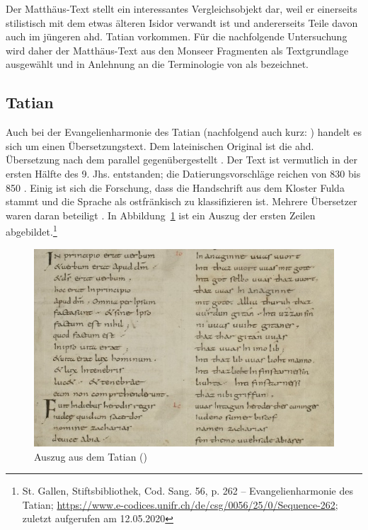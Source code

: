 Der Matthäus-Text stellt ein interessantes Vergleichsobjekt dar, weil er  einerseits stilistisch mit dem etwas älteren Isidor verwandt ist \parencite{Hench1893,Lippert1974} und andererseits Teile davon auch im jüngeren ahd. Tatian vorkommen. Für die nachfolgende Untersuchung wird daher der Matthäus-Text aus den Monseer Fragmenten als Textgrundlage ausgewählt und in Anlehnung an die Terminologie von \textcite{Lippert1974} als  bezeichnet.
  
\subsection{Tatian}\label{sec:tatian}

Auch bei der Evangelienharmonie des Tatian (nachfolgend auch kurz: ) handelt es sich um einen Übersetzungstext. Dem lateinischen Original ist die ahd. Übersetzung nach dem  \parencite[43]{Fleischer2011} parallel gegenübergestellt \parencite[vgl. hierzu auch][128]{Masser1997}. Der Text ist vermutlich in der ersten Hälfte des 9. Jhs. entstanden; die Datierungsvorschläge reichen von 830 \parencite[LXX]{Sievers1961} bis 850 \parencite[127]{Sonderegger2003}. Einig ist sich die Forschung, dass die Handschrift aus dem Kloster Fulda stammt und die Sprache als ostfränkisch zu klassifizieren ist. Mehrere Übersetzer waren daran beteiligt \parencite[s.][31]{Masser1994}. In Abbildung~\ref{abb:tatian-hand} ist ein Auszug der ersten Zeilen abgebildet.\footnote{St. Gallen, Stiftsbibliothek, Cod. Sang. 56, p. 262 –
Evangelienharmonie des Tatian; \url{https://www.e-codices.unifr.ch/de/csg/0056/25/0/Sequence-262}; zuletzt aufgerufen am 12.05.2020}

\begin{figure}[h]
\begin{center}
  \includegraphics[width=10 cm]{images/tatian-handschrift-ausschnitt.jpg}
\caption {Auszug aus dem Tatian ()}
\label{abb:tatian-hand}
\end{center}
\end{figure} 

